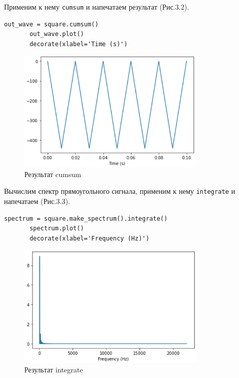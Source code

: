 \documentclass[a4paper,12pt]{report}
\begin{document}
    Применим к нему \texttt{cumsum} и напечатаем результат (Рис.3.2).
\begin{lstlisting}[caption=Использование cumsum]
       out_wave = square.cumsum()
       out_wave.plot()
       decorate(xlabel='Time (s)')
\end{lstlisting}
\begin{figure}[H]
        \centering
        \includegraphics[width=0.8\textwidth]{fig3-2.PNG}
        \caption{Результат cumsum}
        \label{fig:fig3-2}
\end{figure} 

   Вычислим спектр прямоугольного сигнала, применим к нему \texttt{integrate} и напечатаем (Рис.3.3).
\begin{lstlisting}[caption=Использование integrate]
       spectrum = square.make_spectrum().integrate()
       spectrum.plot()
       decorate(xlabel='Frequency (Hz)')
\end{lstlisting}
\begin{figure}[H]
        \centering
        \includegraphics[width=0.8\textwidth]{fig3-3.PNG}
        \caption{Результат integrate}
        \label{fig:fig3-3}
\end{figure} 
    
\end{document}
